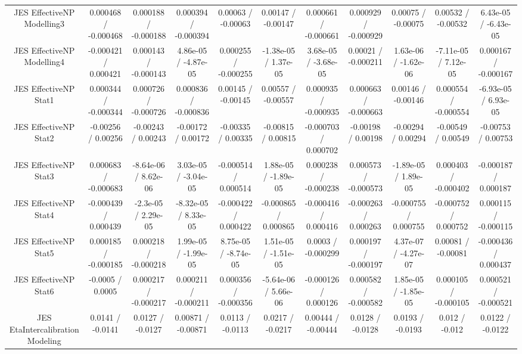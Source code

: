 \begin{table}[htbp]
\begin{center}
\begin{tabular}{|c|c|c|c|c|c|c|c|c|c|c|}
  JES EffectiveNP Modelling3 & 0.000468 / -0.000468 & 0.000188 / -0.000188 & 0.000394 / -0.000394 & 0.00063 / -0.00063 & 0.00147 / -0.00147 & 0.000661 / -0.000661 & 0.000929 / -0.000929 & 0.00075 / -0.00075 & 0.00532 / -0.00532 & 6.43e-05 / -6.43e-05 \\ 
  JES EffectiveNP Modelling4 & -0.000421 / 0.000421 & 0.000143 / -0.000143 & 4.86e-05 / -4.87e-05 & 0.000255 / -0.000255 & -1.38e-05 / 1.37e-05 & 3.68e-05 / -3.68e-05 & 0.00021 / -0.000211 & 1.63e-06 / -1.62e-06 & -7.11e-05 / 7.12e-05 & 0.000167 / -0.000167 \\ 
  JES EffectiveNP Stat1 & 0.000344 / -0.000344 & 0.000726 / -0.000726 & 0.000836 / -0.000836 & 0.00145 / -0.00145 & 0.00557 / -0.00557 & 0.000935 / -0.000935 & 0.000663 / -0.000663 & 0.00146 / -0.00146 & 0.000554 / -0.000554 & -6.93e-05 / 6.93e-05 \\ 
  JES EffectiveNP Stat2 & -0.00256 / 0.00256 & -0.00243 / 0.00243 & -0.00172 / 0.00172 & -0.00335 / 0.00335 & -0.00815 / 0.00815 & -0.000703 / 0.000702 & -0.00198 / 0.00198 & -0.00294 / 0.00294 & -0.00549 / 0.00549 & -0.00753 / 0.00753 \\ 
  JES EffectiveNP Stat3 & 0.000683 / -0.000683 & -8.64e-06 / 8.62e-06 & 3.03e-05 / -3.04e-05 & -0.000514 / 0.000514 & 1.88e-05 / -1.89e-05 & 0.000238 / -0.000238 & 0.000573 / -0.000573 & -1.89e-05 / 1.89e-05 & 0.000403 / -0.000402 & -0.000187 / 0.000187 \\ 
  JES EffectiveNP Stat4 & -0.000439 / 0.000439 & -2.3e-05 / 2.29e-05 & -8.32e-05 / 8.33e-05 & -0.000422 / 0.000422 & -0.000865 / 0.000865 & -0.000416 / 0.000416 & -0.000263 / 0.000263 & -0.000755 / 0.000755 & -0.000752 / 0.000752 & 0.000115 / -0.000115 \\ 
  JES EffectiveNP Stat5 & 0.000185 / -0.000185 & 0.000218 / -0.000218 & 1.99e-05 / -1.99e-05 & 8.75e-05 / -8.74e-05 & 1.51e-05 / -1.51e-05 & 0.0003 / -0.000299 & 0.000197 / -0.000197 & 4.37e-07 / -4.27e-07 & 0.00081 / -0.00081 & -0.000436 / 0.000437 \\ 
  JES EffectiveNP Stat6 & -0.0005 / 0.0005 & 0.000217 / -0.000217 & 0.000211 / -0.000211 & 0.000356 / -0.000356 & -5.64e-06 / 5.66e-06 & -0.000126 / 0.000126 & 0.000582 / -0.000582 & 1.85e-05 / -1.85e-05 & 0.000105 / -0.000105 & 0.000521 / -0.000521 \\ 
  JES EtaIntercalibration Modeling & 0.0141 / -0.0141 & 0.0127 / -0.0127 & 0.00871 / -0.00871 & 0.0113 / -0.0113 & 0.0217 / -0.0217 & 0.00444 / -0.00444 & 0.0128 / -0.0128 & 0.0193 / -0.0193 & 0.012 / -0.012 & 0.0122 / -0.0122 \\ 

\end{tabular}
\end{center}
\end{table}
